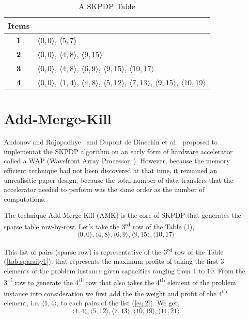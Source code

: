 \begin{table}[htbp]
\caption{A SKPDP Table}
\begin{center}
\begin{tabular}{|c|l|}
\hline
\textbf{Items}& \\
\hline 
  \textbf{1}& $\langle 0, 0\rangle$, $\langle 5, 7\rangle$  \\
  \hline
  \textbf{2}& $\langle 0, 0\rangle$, $\langle 4, 8\rangle$, $\langle 9, 15\rangle$ \\
  \hline
  \textbf{3}& $\langle 0, 0\rangle$, $\langle 4, 8\rangle$, $\langle 6, 9\rangle$, $\langle 9,
              15\rangle$, $\langle 10, 17\rangle$ \\
  \hline
  \textbf{4}& $\langle 0, 0\rangle$, $\langle 1, 4\rangle$, $\langle 4, 8\rangle$, $\langle 5,
              12\rangle$, $\langle 7, 13\rangle$, $\langle 9, 15\rangle$,
              $\langle 10, 19\rangle$ \\
  \hline
\end{tabular}
\label{tab:sparsity2}
\end{center}
\end{table}

\section{Add-Merge-Kill}
\label{sec:merge-kill}
Andonov and Rajopadhye~\cite{sanjay-asap96} and Dupont de Dinechin et
al.~\cite{sanjay-irreg96} proposed to implementat the SKPDP algorithm on an
early form of hardware accelerator called a WAP (Wavefront Array
Processor~\cite{kung-sy-vlsi, kung-sy-etal}).  However, because the memory
efficient technique had not been discovered at that time, it remained an
unrealisitic paper design, because the total number of data transfers that the
accelerator needed to perform was the same order as the number of
computations.

The technique Add-Merge-Kill (AMK) is the core of SKPDP that generates the sparse table row-by-row. Let's take the 3\textsuperscript{rd} row of the Table (\ref{tab:sparsity2}),
\begin{equation}
\label{eq:list1}
\langle 0, 0\rangle, \langle 4, 8\rangle, \langle 6, 9\rangle, \langle 9, 15\rangle, \langle 10, 17\rangle
\end{equation}

This list of pairs (sparse row) is representative of the 3\textsuperscript{rd} row of the Table (\ref{tab:sparsity1}), that represents the maximum profits of taking the first 3 elements of the problem instance given capacities ranging from $1$ to $10$. From the 3\textsuperscript{rd} row to generate the 4\textsuperscript{th} row that also takes the 4\textsuperscript{th} element of the problem instance into consideration we first add the the weight and profit of the 4\textsuperscript{th} element, i.e. $\langle 1,4 \rangle$, to each pairs of the list (\ref{eq:2}).
We get,
\begin{equation}
\label{eq:list2}
\langle 1, 4\rangle, \langle 5, 12\rangle, \langle 7, 13\rangle, \langle 10, 19\rangle, \langle 11, 21\rangle
\end{equation}

